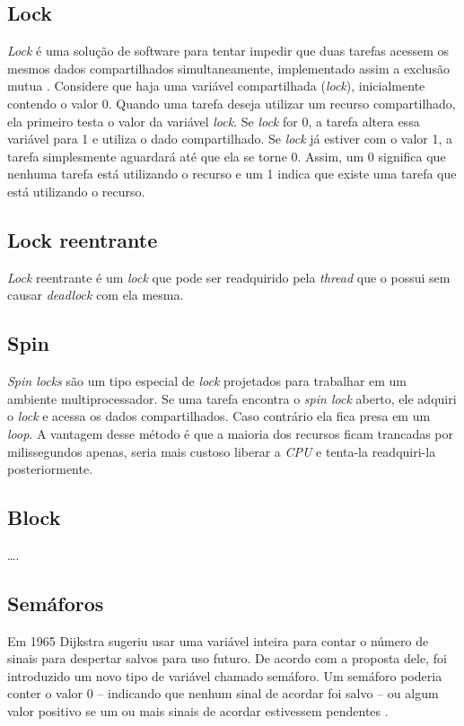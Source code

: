 \subsection{Lock}

\textit{Lock} é uma solução de software para tentar impedir que duas
tarefas acessem os mesmos dados compartilhados simultaneamente,
implementado assim a exclusão mutua \cite{MCRT}. Considere que haja uma variável
compartilhada (\textit{lock}), inicialmente contendo o valor 0. Quando uma
tarefa deseja utilizar um recurso compartilhado, ela primeiro testa 
o valor da variável \textit{lock}. Se \textit{lock} for 0, a tarefa
altera essa variável para 1 e utiliza o dado compartilhado. Se \textit{lock}
já estiver com o valor 1, a tarefa simplesmente aguardará até que ela
se torne 0. Assim, um 0 significa que nenhuma tarefa está utilizando o
recurso e um 1 indica que existe uma tarefa que está utilizando o recurso.

\subsection{Lock reentrante}

\textit{Lock} reentrante é um \textit{lock} que pode ser readquirido pela
\textit{thread} que o possui sem causar \textit{deadlock} com ela mesma.

\subsection{Spin}

\textit{Spin locks} são um tipo especial de \textit{lock} projetados
para trabalhar em um ambiente multiprocessador. Se uma tarefa encontra
o \textit{spin lock} aberto, ele adquiri o \textit{lock} e acessa os
dados compartilhados.  Caso contrário ela fica presa em um {\it loop}.
A vantagem desse método é que a maioria dos recursos ficam trancadas por
milissegundos apenas, seria mais custoso liberar a \textit{CPU} e tenta-la
readquiri-la posteriormente.

\subsection{Block}
….


\subsection{Semáforos}

Em 1965 Dijkstra sugeriu usar uma variável inteira para contar o número de
sinais para despertar salvos para uso futuro.  De acordo com a proposta dele,
foi introduzido um novo tipo de variável chamado semáforo. Um semáforo
poderia conter o valor 0 – indicando que nenhum sinal de acordar foi
salvo – ou algum valor positivo se um ou mais sinais de acordar estivessem
pendentes \cite{TANE}.

